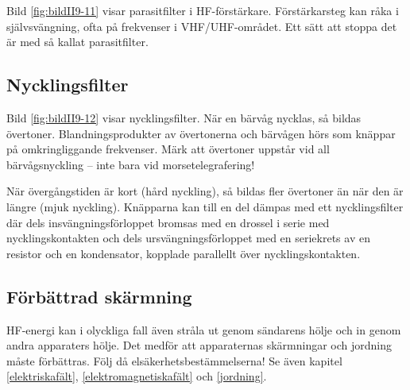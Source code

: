Bild \ref{fig:bildII9-11} visar parasitfilter i HF-förstärkare.
Förstärkarsteg kan råka i självsvängning, ofta på frekvenser i VHF/UHF-området.
Ett sätt att stoppa det är med så kallat parasitfilter.

\subsection{Nycklingsfilter}
\label{Nycklingsfilter}

Bild \ref{fig:bildII9-12} visar nycklingsfilter.
När en bärvåg nycklas, så bildas övertoner.
Blandningsprodukter av övertonerna och bärvågen hörs som knäppar på
omkringliggande frekvenser.
Märk att övertoner uppstår vid all bärvågsnyckling -- inte bara vid
morsetelegrafering!

När övergångstiden är kort (hård nyckling), så bildas fler övertoner
än när den är längre (mjuk nyckling).
Knäpparna kan till en del dämpas med ett nycklingsfilter där dels
insvängningsförloppet bromsas med en drossel i serie med nycklingskontakten och
dels ursvängningsförloppet med en seriekrets av en resistor och en kondensator,
kopplade parallellt över nycklingskontakten.


\subsection{Förbättrad skärmning}

HF-energi kan i olyckliga fall även stråla ut genom sändarens hölje
och in genom andra apparaters hölje.
Det medför att apparaternas skärmningar och jordning måste förbättras.
Följ då elsäkerhetsbestämmelserna!
Se även kapitel \ref{elektriskafält}, \ref{elektromagnetiskafält} och
\ref{jordning}.
